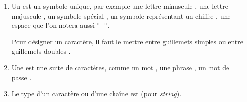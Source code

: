 \documentclass[11pt,class=report,crop=false]{standalone}
\begin{document}
\newcommand{\badletter}[1]{\underline{\textcolor{red}{#1}}}







\begin{cours}
\sauteligne
\begin{enumerate}
  \item Un  est un symbole unique, par exemple une lettre minuscule , une lettre majuscule , un symbole spécial , un symbole représentant un chiffre , une espace  que l'on notera aussi \lstinline[showstringspaces=true]!" "!.
  
Pour désigner un caractère, il faut le mettre entre guillemets simples  ou entre guillemets doubles .
  
  \item Une  est une suite de caractères, comme un mot , une phrase , un mot de passe \codeinline{"N[w5ms\}e!"}.
  
  \item Le type d'un caractère ou d'une chaîne est  (pour \emph{string}).
  

\end{enumerate}  
\end{cours}


\end{document}
